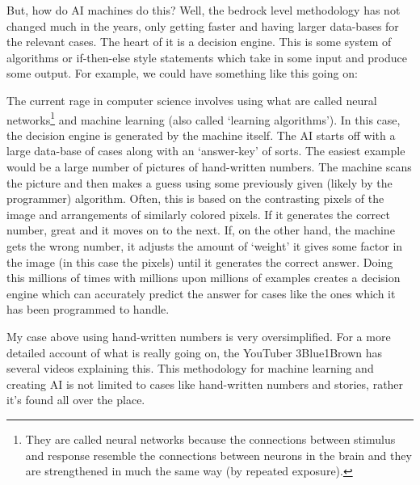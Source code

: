 But, how do AI machines do this? Well, the bedrock level methodology has not changed much in the years, only getting faster and having larger data-bases for the relevant cases. The heart of it is a decision engine. This is some system of algorithms or if-then-else style statements which take in some input and produce some output. For example, we could have something like this going on:


The current rage in computer science involves using what are called neural networks\footnote{They are called neural networks because the connections between stimulus and response resemble the connections between neurons in the brain and they are strengthened in much the same way (by repeated exposure).}  and machine learning (also called `learning algorithms'). In this case, the decision engine is generated by the machine itself. The AI starts off with a large data-base of cases along with an `answer-key' of sorts. The easiest example would be a large number of pictures of hand-written numbers. The machine scans the picture and then makes a guess using some previously given (likely by the programmer) algorithm. Often, this is based on the contrasting pixels of the image and arrangements of similarly colored pixels. If it generates the correct number, great and it moves on to the next. If, on the other hand, the machine gets the wrong number, it adjusts the amount of `weight' it gives some factor in the image (in this case the pixels) until it generates the correct answer. Doing this millions of times with millions upon millions of examples creates a decision engine which can accurately predict the answer for cases like the ones which it has been programmed to handle. 

My case above using hand-written numbers is very oversimplified. For a more detailed account of what is really going on, the YouTuber 3Blue1Brown has several videos explaining this.\autocite{BlueBrown}  This methodology for machine learning and creating AI is not limited to cases like hand-written numbers and stories, rather it's found all over the place.

